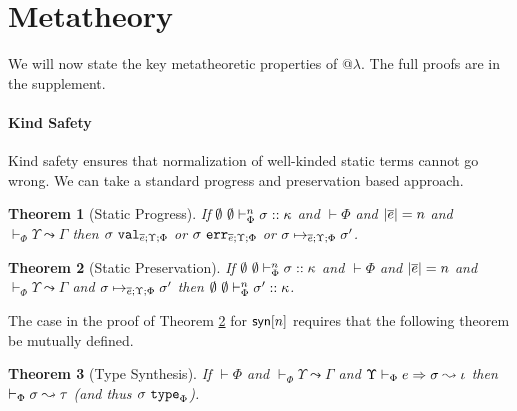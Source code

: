 \documentclass[10pt,preprint]{sigplanconf}
\newtheorem{theorem}{Theorem}
\newtheorem{lemma}{Lemma}
\begin{document}


\section{Metatheory}\label{metatheory}
We will now state the key metatheoretic properties of @$\lambda$. The full proofs are in the supplement. 

\paragraph{Kind Safety} Kind safety ensures that normalization of well-kinded static terms cannot go wrong. We can take a standard progress and preservation based approach. 
\begin{theorem}[Static Progress]\label{thm:static-progress}
If $\emptyset~\emptyset \vdash_{\Phi}^{n} \sigma :: \kappa$ and $\vdash \Phi$ and $|\overline{e}|=n$ and $\vdash_\Phi \Upsilon \leadsto \Gamma$ then $\sigma~\mathtt{val}_{\overline{e}; \Upsilon; \Phi}$ or $\sigma~\mathtt{err}_{\overline{e}; \Upsilon; \Phi}$ or $\sigma \mapsto_{\overline{e}; \Upsilon; \Phi} \sigma'$.
\end{theorem}

\begin{theorem}[Static Preservation]\label{thm:static-preservation}
If $\emptyset~\emptyset \vdash_{\Phi}^{n} \sigma :: \kappa$ and $\vdash \Phi$ and $|\overline{e}|=n$ and $\vdash_\Phi \Upsilon \leadsto \Gamma$ and $\sigma \mapsto_{\overline{e}; \Upsilon; \Phi} \sigma'$ then $\emptyset~\emptyset \vdash_{\Phi}^{n} \sigma' :: \kappa$.
\end{theorem}
The case in the proof of Theorem \ref{thm:static-preservation} for ${\sf syn}[n]$ requires that the following theorem be mutually defined. %
\begin{theorem}[Type Synthesis]
If $\vdash \Phi$ and $\vdash_\Phi \Upsilon \leadsto \Gamma$ and $\Upsilon \vdash_{\Phi} e \Rightarrow \sigma \leadsto \iota$ then $\vdash_\Phi \sigma \leadsto \tau$ (and thus $\sigma~\texttt{type}_{\Phi}$). 
\end{theorem}
\end{document}
